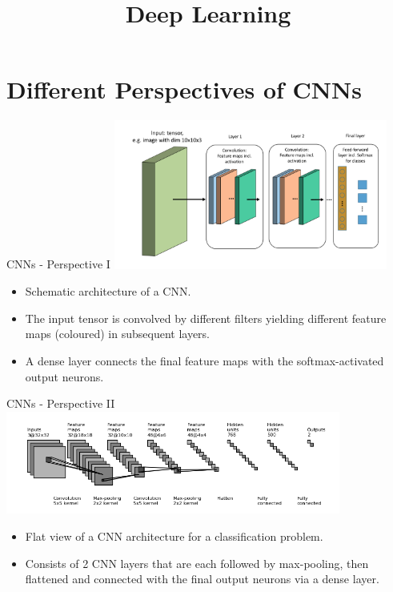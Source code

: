 




\newcommand{\titlefigure}{figure/alexnet.png}
\newcommand{\learninggoals}{
  \item Architecture
}

\title{Deep Learning}
\date{}




\section{Different Perspectives of CNNs}
\begin{vbframe}{CNNs - Perspective I}
\center
\includegraphics[width=9cm]{figure/cnn_scheme.png}
\begin{itemize}
\item Schematic architecture of a CNN.
\item The input tensor is convolved by different filters yielding different feature maps (coloured) in subsequent layers.
\item A dense layer connects the final feature maps with the softmax-activated output neurons.
\end{itemize}
\end{vbframe}

\begin{vbframe}{CNNs - Perspective II}
\center
\includegraphics[width=11cm]{figure/cnn_flat.png}
\begin{itemize}
\item Flat view of a CNN architecture for a classification problem.
\item Consists of 2 CNN layers that are each followed by max-pooling, then flattened and connected with the final output neurons via a dense layer.
\end{itemize}
\end{vbframe}

